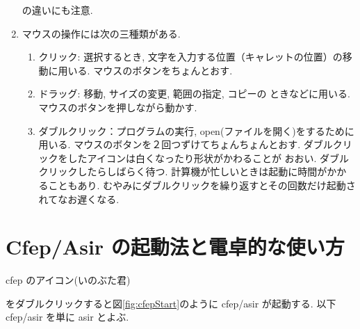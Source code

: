 \documentclass{jbook}
\begin{document}
\begin{enumerate}
 の違いにも注意.
%
%
\item
 マウスの操作には次の三種類がある.
% 
%
\begin{enumerate}
\item クリック: 選択するとき, 
       文字を入力する位置（キャレットの位置）の移動に用いる.
      マウスのボタンをちょんとおす.  
\item ドラッグ: 移動, サイズの変更, 範囲の指定, コピーの
      ときなどに用いる.
      マウスのボタンを押しながら動かす.
\item ダブルクリック：プログラムの実行, open(ファイルを開く)をするために
      用いる.  
       マウスのボタンを２回つずけてちょんちょんとおす.
      ダブルクリックをしたアイコンは白くなったり形状がかわることが
      おおい.
      ダブルクリックしたらしばらく待つ.
      計算機が忙しいときは起動に時間がかかることもあり.
      むやみにダブルクリックを繰り返すとその回数だけ起動されてなお遅くなる.
\end{enumerate}
%
\end{enumerate}


\section{ Cfep/Asir の起動法と電卓的な使い方 }

cfep のアイコン(いのぶた君)
\begin{center}
\end{center}
をダブルクリックすると図\ref{fig:cfepStart}のように cfep/asir が起動する.
以下 cfep/asir を単に asir とよぶ.
\end{document}
